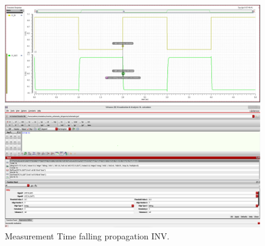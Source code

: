 \begin{figure}[H]
	\begin{minipage}{0.5\linewidth}
		\includegraphics[width=\linewidth]{section/EX1/INV/EX1_INV_Tpdf_Waveform.png}
	\end{minipage}
	\begin{minipage}{0.5\linewidth}
		\includegraphics[width=\linewidth]{section/EX1/INV/EX1_INV_Tpdf_Cal.png}
	\end{minipage}
	\caption{Measurement Time falling propagation INV.}
\end{figure}

